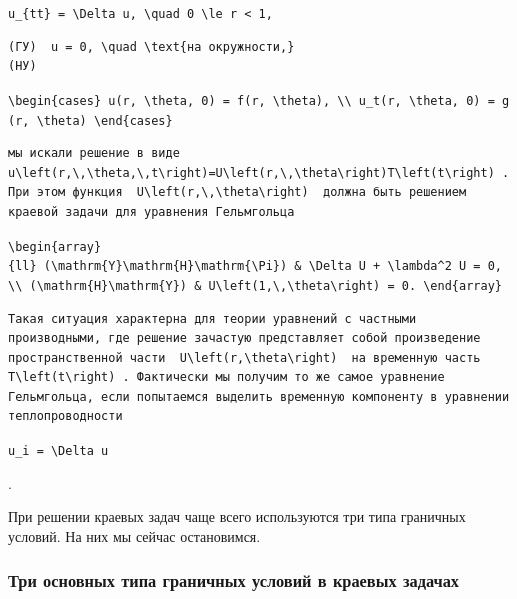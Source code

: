 \documentclass[
  ukrainian,
]{article}
\begin{document}
\texttt{u\_\{tt\}\ =\ \textbackslash{}Delta\ u,\ \textbackslash{}quad\ 0\ \textbackslash{}le\ r\ \textless{}\ 1,}

\begin{verbatim}
(ГУ)  u = 0, \quad \text{на окружности,}   
(НУ)
\end{verbatim}

\texttt{\textbackslash{}begin\{cases\}\ u(r,\ \textbackslash{}theta,\ 0)\ =\ f(r,\ \textbackslash{}theta),\ \textbackslash{}\textbackslash{}\ u\_t(r,\ \textbackslash{}theta,\ 0)\ =\ g(r,\ \textbackslash{}theta)\ \textbackslash{}end\{cases\}}

\begin{verbatim}
мы искали решение в виде  u\left(r,\,\theta,\,t\right)=U\left(r,\,\theta\right)T\left(t\right) . При этом функция  U\left(r,\,\theta\right)  должна быть решением краевой задачи для уравнения Гельмгольца
\end{verbatim}

\texttt{\textbackslash{}begin\{array\}\{ll\}\ (\textbackslash{}mathrm\{Y\}\textbackslash{}mathrm\{H\}\textbackslash{}mathrm\{\textbackslash{}Pi\})\ \&\ \textbackslash{}Delta\ U\ +\ \textbackslash{}lambda\^{}2\ U\ =\ 0,\ \textbackslash{}\textbackslash{}\ (\textbackslash{}mathrm\{H\}\textbackslash{}mathrm\{Y\})\ \&\ U\textbackslash{}left(1,\textbackslash{},\textbackslash{}theta\textbackslash{}right)\ =\ 0.\ \textbackslash{}end\{array\}}

\begin{verbatim}
Такая ситуация характерна для теории уравнений с частными производными, где решение зачастую представляет собой произведение пространственной части  U\left(r,\theta\right)  на временную часть  T\left(t\right) . Фактически мы получим то же самое уравнение Гельмгольца, если попытаемся выделить временную компоненту в уравнении теплопроводности
\end{verbatim}

\texttt{u\_i\ =\ \textbackslash{}Delta\ u}

.

При решении краевых задач чаще всего используются три типа граничных
условий. На них мы сейчас остановимся.

\subsubsection{Три основных типа граничных условий в краевых
задачах}\label{ux442ux440ux438-ux43eux441ux43dux43eux432ux43dux44bux445-ux442ux438ux43fux430-ux433ux440ux430ux43dux438ux447ux43dux44bux445-ux443ux441ux43bux43eux432ux438ux439-ux432-ux43aux440ux430ux435ux432ux44bux445-ux437ux430ux434ux430ux447ux430ux445}
\end{document}
